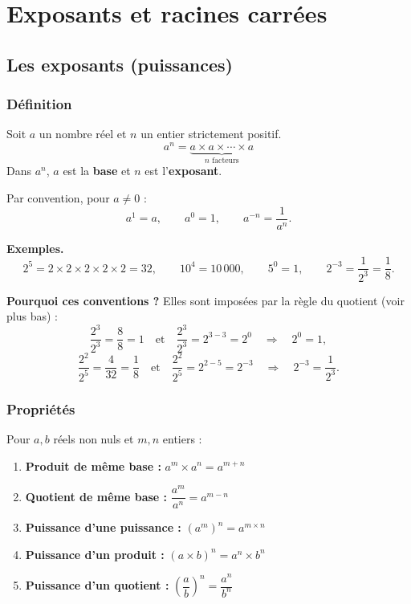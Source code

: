 \documentclass[../main.tex]{subfiles}
\begin{document}
\ifSubfilesClassLoaded{\PageLegaleChapitre}{}

\chapter{Exposants et racines carrées}
\label{chap:exposants-et-racines}

\section{Les exposants (puissances)}

\subsection{Définition}

\begin{definition}
Soit $a$ un nombre réel et $n$ un entier strictement positif.
\[
a^n = \underbrace{a \times a \times \cdots \times a}_{n \text{ facteurs}}
\]
Dans $a^n$, $a$ est la \textbf{base} et $n$ est l'\textbf{exposant}.

Par convention, pour $a \neq 0$ :
\[
a^1 = a, \qquad a^0 = 1, \qquad a^{-n} = \frac{1}{a^n}.
\]
\end{definition}

\textbf{Exemples.}
\[
2^5 = 2\times2\times2\times2\times2 = 32, \qquad
10^4 = 10\,000, \qquad
5^0 = 1, \qquad
2^{-3} = \frac{1}{2^3} = \frac{1}{8}.
\]

\textbf{Pourquoi ces conventions ?} Elles sont imposées par la règle du quotient (voir plus bas) :
\[
\frac{2^3}{2^3} = \frac{8}{8} = 1 \quad\text{et}\quad \frac{2^3}{2^3} = 2^{3-3} = 2^0
\quad\Rightarrow\quad 2^0 = 1,
\]
\[
\frac{2^2}{2^5} = \frac{4}{32} = \frac{1}{8} \quad\text{et}\quad \frac{2^2}{2^5} = 2^{2-5} = 2^{-3}
\quad\Rightarrow\quad 2^{-3} = \frac{1}{2^3}.
\]

\subsection{Propriétés}

Pour $a, b$ réels non nuls et $m, n$ entiers :

\begin{propriete}
\begin{enumerate}[label=\textbf{(P\arabic*)}]
  \item \textbf{Produit de même base :} $a^m \times a^n = a^{m+n}$
  \item \textbf{Quotient de même base :} $\dfrac{a^m}{a^n} = a^{m-n}$
  \item \textbf{Puissance d'une puissance :} $(a^m)^n = a^{m \times n}$
  \item \textbf{Puissance d'un produit :} $(a \times b)^n = a^n \times b^n$
  \item \textbf{Puissance d'un quotient :} $\left(\dfrac{a}{b}\right)^n = \dfrac{a^n}{b^n}$
\end{enumerate}
\end{propriete}
\end{document}
